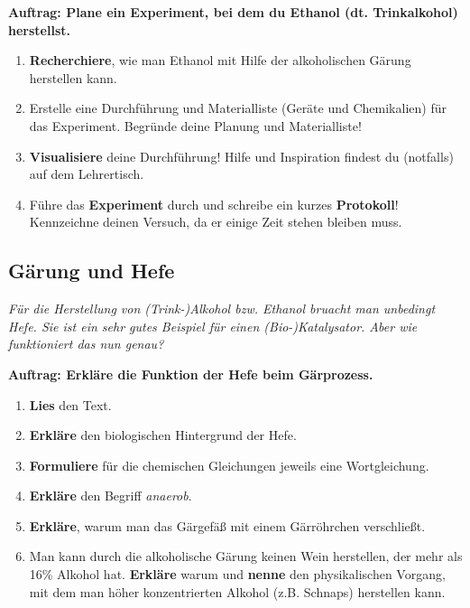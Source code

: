 \documentclass{scrartcl}  %
\begin{document}
				\textbf{Auftrag: Plane ein Experiment, bei dem du Ethanol (dt. Trinkalkohol) herstellst.}
				\begin{enumerate}
					\item \textbf{Recherchiere}, wie man Ethanol mit Hilfe der alkoholischen Gärung herstellen kann.
					\item Erstelle eine Durchführung und Materialliste (Geräte und Chemikalien) für das Experiment. Begründe deine Planung und Materialliste! 
					\item \textbf{Visualisiere} deine Durchführung! Hilfe und Inspiration findest du (notfalls) auf dem Lehrertisch.
					\item Führe das \textbf{Experiment} durch und schreibe ein kurzes \textbf{Protokoll}! Kennzeichne deinen Versuch, da er einige Zeit stehen bleiben muss.
				\end{enumerate}

			\subsection{Gärung und Hefe}	
			
				\textit{Für die Herstellung von (Trink-)Alkohol bzw. Ethanol bruacht man unbedingt Hefe. Sie ist ein sehr gutes Beispiel für einen (Bio-)Katalysator. Aber wie funktioniert das nun genau?}\newline	
	
				\noindent \textbf{Auftrag: Erkläre die Funktion der Hefe beim Gärprozess.}
				\begin{enumerate}
					\item \textbf{Lies} den Text.
					\item \textbf{Erkläre} den biologischen Hintergrund der Hefe.
					\item \textbf{Formuliere} für die chemischen Gleichungen jeweils eine Wortgleichung.
					\item \textbf{Erkläre} den Begriff \textit{anaerob}.
					\item \textbf{Erkläre}, warum man das Gärgefäß mit einem Gärröhrchen verschließt.
					\item Man kann durch die alkoholische Gärung keinen Wein herstellen, der mehr als 16\% Alkohol hat. \textbf{Erkläre} warum und \textbf{nenne} den physikalischen Vorgang, mit dem man höher konzentrierten Alkohol (z.B. Schnaps) herstellen kann.
				\end{enumerate}
\end{document}
